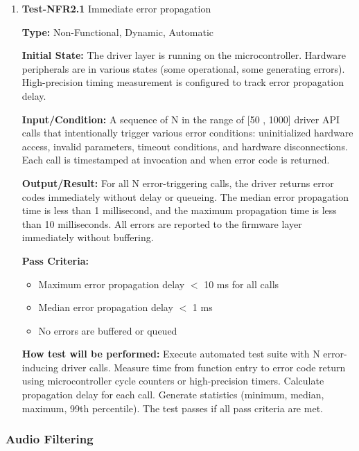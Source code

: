 \documentclass[12pt, titlepage]{article}
\begin{document}
\begin{enumerate}

\item{\textbf{Test-NFR2.1} Immediate error propagation\\}

\textbf{Type:} Non-Functional, Dynamic, Automatic
					
\textbf{Initial State:} 
The driver layer is running on the microcontroller. Hardware peripherals are in
various states (some operational, some generating errors). High-precision timing
measurement is configured to track error propagation delay.
					
\textbf{Input/Condition:} 
A sequence of N in the range of [50 , 1000] driver API calls that intentionally
trigger various error conditions: uninitialized hardware access, invalid
parameters, timeout conditions, and hardware disconnections. Each call is
timestamped at invocation and when error code is returned.
					
\textbf{Output/Result:} 
For all N error-triggering calls, the driver returns error codes immediately
without delay or queueing. The median error propagation time is less than 1
millisecond, and the maximum propagation time is less than 10 milliseconds. All
errors are reported to the firmware layer immediately without buffering.

\textbf{Pass Criteria:}
\begin{itemize}
\item Maximum error propagation delay $<$ 10 ms for all calls
\item Median error propagation delay $<$ 1 ms
\item No errors are buffered or queued
\end{itemize}
					
\textbf{How test will be performed:} 
Execute automated test suite with N error-inducing driver calls. Measure time
from function entry to error code return using microcontroller cycle counters or
high-precision timers. Calculate propagation delay for each call. Generate
statistics (minimum, median, maximum, 99th percentile). The test passes if all
pass criteria are met.

\end{enumerate}

\subsubsection{Audio Filtering}
\end{document}
